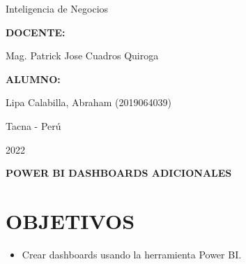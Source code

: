\documentclass[12pt,letterpaper]{article}
\begin{document}
\begin{titlepage}
\begin{center}
\begin{large}
                Inteligencia de Negocios\\
            \end{large}
            \vspace*{0.2in}
            \begin{Large}
                \textbf{DOCENTE:} \\
            \end{Large}
            \vspace*{0.1in}
            \begin{large}
                Mag. Patrick Jose Cuadros Quiroga\\
            \end{large}
            \vspace*{0.3in}
            \begin{large}
                \textbf{ALUMNO:} \\
                \begin{flushleft}
                    Lipa Calabilla, Abraham  		\hfill	(2019064039) \\
                \end{flushleft}
            \end{large}
            \vspace*{1.3in}
            \begin{large}
                Tacna - Perú\\
            \end{large}
            \vspace*{0.1in}
            \begin{large}
                2022\\
            \end{large}
        \end{center}
    \end{titlepage}
    
    \newpage
    \tableofcontents
    \justify
    \newpage
    \begin{LARGE}
        \begin{center}
            \textbf{POWER BI DASHBOARDS ADICIONALES} \\
        \end{center}
    \end{LARGE}
    
    \section{OBJETIVOS}
    \begin{itemize}
        \item Crear dashboards usando la herramienta Power BI.
    \end{itemize}
    
\end{document}
